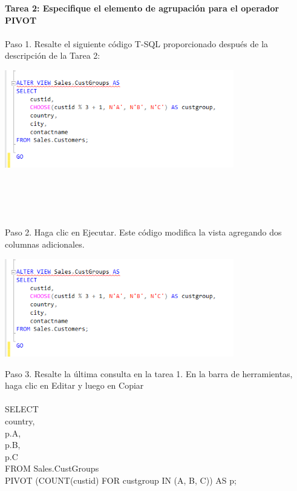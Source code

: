 \begin{flushleft}
\textbf{Tarea 2: Especifique el elemento de agrupación para el operador PIVOT}
\textbf{}\\
\textbf{}\\
Paso 1. Resalte el siguiente código T-SQL proporcionado después de la descripción de la Tarea 2:
\begin{center}
	\includegraphics[width=10cm]{./Imagenes/2img1} 
	\end{center}
\textbf{}\\
\textbf{}\\
\textbf{}\\
\textbf{}\\
Paso 2. Haga clic en Ejecutar. Este código modifica la vista agregando dos columnas adicionales.
\begin{center}
	\includegraphics[width=10cm]{./Imagenes/2img1} 
	\end{center}


Paso 3. Resalte la última consulta en la tarea 1. En la barra de herramientas, haga clic en Editar y luego en Copiar
\textbf{}\\
\textbf{}\\
SELECT\\
country,\\
p.A,\\
p.B,\\
p.C\\
FROM Sales.CustGroups\\
PIVOT (COUNT(custid) FOR custgroup IN (A, B, C)) AS p;\\

\textbf{}\\
\textbf{}\\



\end{flushleft}
